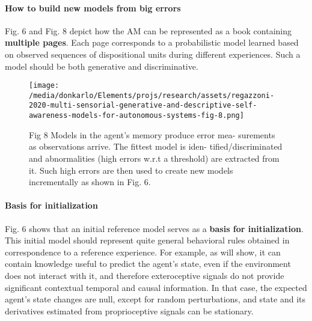 \documentclass{article}
\begin{document}
		\paragraph{How to build new models from big errors}
		\citet{regazzoni-2020-multi-sensorial-generative-and-descriptive-self-awareness-models-for-autonomous-systems} Fig. 6 and Fig. \citet{regazzoni-2020-multi-sensorial-generative-and-descriptive-self-awareness-models-for-autonomous-systems} 8 depict how the AM can be represented as
		a book containing \textbf{multiple pages}. Each page corresponds to
		a probabilistic model learned based on observed sequences of
		dispositional units during different experiences. Such a model
		should be both generative and discriminative. 
		\begin{figure*}
			\centering
			\texttt{[image: /media/donkarlo/Elements/projs/research/assets/regazzoni-2020-multi-sensorial-generative-and-descriptive-self-awareness-models-for-autonomous-systems-fig-8.png]}
			\caption{\cite{regazzoni-2020-multi-sensorial-generative-and-descriptive-self-awareness-models-for-autonomous-systems} Fig 8 Models in the agent’s memory produce error mea-
				surements as observations arrive. The fittest model is iden-
				tified/discriminated and abnormalities (high errors w.r.t a
				threshold) are extracted from it. Such high errors are then
				used to create new models incrementally as shown in Fig. 6.
			}
			\label{fig:regazzoni-2020-multi-sensorial-generative-and-descriptive-self-awareness-models-for-autonomous-systems-fig-8.png}
		\end{figure*}	
		\paragraph{Basis for initialization} \citet{regazzoni-2020-multi-sensorial-generative-and-descriptive-self-awareness-models-for-autonomous-systems}Fig. 6 shows that
		an initial reference model serves as a \textbf{basis for initialization}.
		This initial model should represent quite general behavioral
		rules obtained in correspondence to a reference experience. For
		example, as \citet{regazzoni-2020-multi-sensorial-generative-and-descriptive-self-awareness-models-for-autonomous-systems} will show, it can contain knowledge useful to
		predict the agent’s state, even if the environment does not interact with it, and therefore exteroceptive signals do not provide
		significant contextual temporal and causal information. In that
		case, the expected agent’s state changes are null, except for
		random perturbations, and state and its derivatives estimated
		from proprioceptive signals can be stationary.
\end{document}
